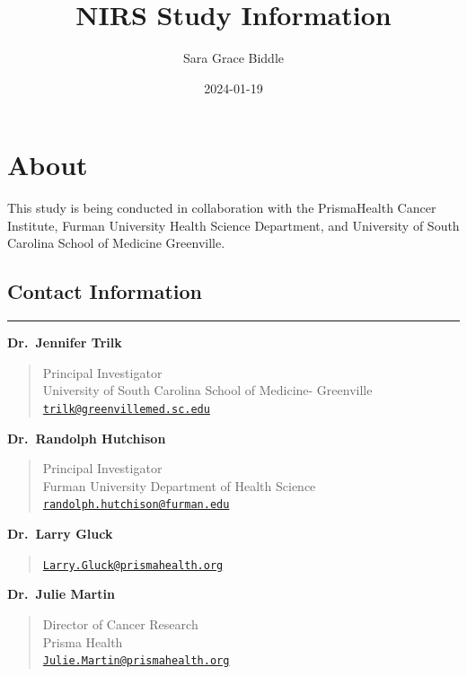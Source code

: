 \documentclass[
]{book}
\title{NIRS Study Information}
\author{Sara Grace Biddle}
\date{2024-01-19}
\begin{document}
\maketitle

{
\setcounter{tocdepth}{1}
\tableofcontents
}
\hypertarget{about}{%
\chapter{About}\label{about}}

This study is being conducted in collaboration with the PrismaHealth Cancer Institute, Furman University Health Science Department, and University of South Carolina School of Medicine Greenville.

\hypertarget{contact-information}{%
\section{Contact Information}\label{contact-information}}

\begin{center}\rule{0.5\linewidth}{0.5pt}\end{center}

\textbf{Dr.~Jennifer Trilk}

\begin{quote}
Principal Investigator\\
University of South Carolina School of Medicine- Greenville\\
\href{mailto:trilk@greenvillemed.sc.edu}{\nolinkurl{trilk@greenvillemed.sc.edu}}
\end{quote}

\textbf{Dr.~Randolph Hutchison}

\begin{quote}
Principal Investigator\\
Furman University Department of Health Science\\
\href{mailto:randolph.hutchison@furman.edu}{\nolinkurl{randolph.hutchison@furman.edu}}
\end{quote}

\textbf{Dr.~Larry Gluck}

\begin{quote}
\href{mailto:Larry.Gluck@prismahealth.org}{\nolinkurl{Larry.Gluck@prismahealth.org}}
\end{quote}

\textbf{Dr.~Julie Martin}

\begin{quote}
Director of Cancer Research\\
Prisma Health\\
\href{mailto:Julie.Martin@prismahealth.org}{\nolinkurl{Julie.Martin@prismahealth.org}}
\end{quote}
\end{document}
